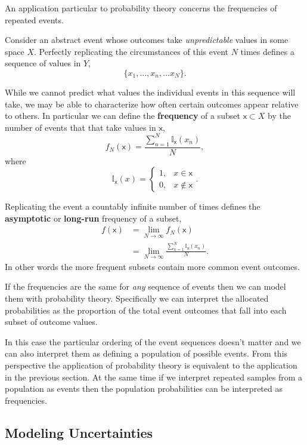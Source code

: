 \documentclass[
  letterpaper,
  DIV=11,
  numbers=noendperiod]{scrartcl}
\begin{document}
An application particular to probability theory concerns the frequencies
of repeated events.

Consider an abstract event whose outcomes take \emph{unpredictable}
values in some space \(X\). Perfectly replicating the circumstances of
this event \(N\) times defines a sequence of values in \(Y\), \[
\{ x_{1}, \ldots, x_{n}, \ldots x_{N} \}.
\]

While we cannot predict what values the individual events in this
sequence will take, we may be able to characterize how often certain
outcomes appear relative to others. In particular we can define the
\textbf{frequency} of a subset \(\mathsf{x} \subset X\) by the number of
events that that take values in \(\mathsf{x}\), \[
f_{N}(\mathsf{x})
= \frac{ \sum_{n = 1}^{N} \mathbb{I}_{\mathsf{x}}(x_{n}) }{N},
\] where \[
\mathbb{I}_{\mathsf{x}}(x)
=
\left\{
\begin{array}{rr}
1, & x \in \mathsf{x} \\
0, & x \notin \mathsf{x}
\end{array}
\right. .
\]

Replicating the event a countably infinite number of times defines the
\textbf{asymptotic} or \textbf{long-run} frequency of a subset,
\begin{align*}
f(\mathsf{x})
&=
\lim_{N \rightarrow \infty} f_{N}(\mathsf{x})
\\
&=
\lim_{N \rightarrow \infty}
\frac{ \sum_{n = 1}^{N} \mathbb{I}_{\mathsf{x}}(x_{n}) }{N}.
\end{align*} In other words the more frequent subsets contain more
common event outcomes.

If the frequencies are the same for \emph{any} sequence of events then
we can model them with probability theory. Specifically we can interpret
the allocated probabilities as the proportion of the total event
outcomes that fall into each subset of outcome values.

In this case the particular ordering of the event sequences doesn't
matter and we can also interpret them as defining a population of
possible events. From this perspective the application of probability
theory is equivalent to the application in the previous section. At the
same time if we interpret repeated samples from a population as events
then the population probabilities can be interpreted as frequencies.

\hypertarget{modeling-uncertainties}{%
\subsection{Modeling Uncertainties}\label{modeling-uncertainties}}
\end{document}
